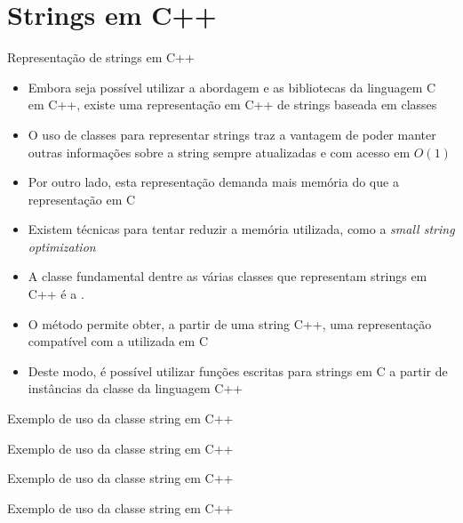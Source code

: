 \section{Strings em C++}

\begin{frame}[fragile]{Representação de strings em C++}

    \begin{itemize}
        \item Embora seja possível utilizar a abordagem e as bibliotecas da linguagem C em C++, 
            existe uma representação em C++ de strings baseada em classes
        \pause

        \item O uso de classes para representar strings traz a vantagem de poder manter outras 
            informações sobre a string sempre atualizadas e com acesso em $O(1)$
        \pause

        \item Por outro lado, esta representação demanda mais memória do que a representação em C
        \pause

        \item Existem técnicas para tentar reduzir a memória utilizada, como a \textit{small string optimization}
        \pause

        \item A classe fundamental dentre as várias classes que representam strings em C++ é a
            .
        \pause

        \item O método  permite obter, a partir de uma string C++, uma 
            representação compatível com a utilizada em C
        \pause

        \item Deste modo, é possível utilizar funções escritas para strings em C a partir de 
            instâncias da classe da linguagem C++
    \end{itemize}

\end{frame}

\begin{frame}[fragile]{Exemplo de uso da classe string em C++}
\end{frame}

\begin{frame}[fragile]{Exemplo de uso da classe string em C++}
\end{frame}

\begin{frame}[fragile]{Exemplo de uso da classe string em C++}
\end{frame}

\begin{frame}[fragile]{Exemplo de uso da classe string em C++}
\end{frame}
